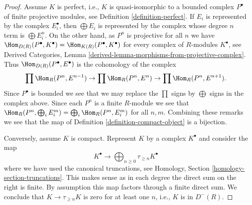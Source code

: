 \begin{proof}
Assume $K$ is perfect, i.e., $K$ is quasi-isomorphic to a bounded complex
$P^\bullet$ of finite projective modules, see
Definition \ref{definition-perfect}. If $E_i$ is represented by the complex
$E_i^\bullet$, then $\bigoplus E_i$ is represented by the complex
whose degree $n$ term is $\bigoplus E_i^n$. On the other hand,
as $P^n$ is projective for all $n$ we have
$\Hom_{D(R)}(P^\bullet, K^\bullet) = \Hom_{K(R)}(P^\bullet, K^\bullet)$
for every complex of $R$-modules $K^\bullet$, see
Derived Categories,
Lemma \ref{derived-lemma-morphisms-from-projective-complex}.
Thus $\Hom_{D(R)}(P^\bullet, E^\bullet)$ is the cohomology of the complex
$$
\prod \Hom_R(P^n, E^{n - 1}) \to
\prod \Hom_R(P^n, E^n) \to
\prod \Hom_R(P^n, E^{n + 1}).
$$
Since $P^\bullet$ is bounded we see that we may replace the $\prod$
signs by $\bigoplus$ signs in the complex above. Since each $P^n$ is a finite
$R$-module we see that
$\Hom_R(P^n, \bigoplus_i E_i^m) = \bigoplus_i \Hom_R(P^n, E_i^m)$
for all $n, m$.
Combining these remarks we see that the map of
Definition \ref{definition-compact-object}
is a bijection.

\medskip\noindent
Conversely, assume $K$ is compact.
Represent $K$ by a complex $K^\bullet$ and consider the map
$$
K^\bullet
\longrightarrow
\bigoplus\nolimits_{n \geq 0} \tau_{\geq n} K^\bullet
$$
where we have used the canonical truncations, see
Homology, Section \ref{homology-section-truncations}.
This makes sense as in each degree the direct sum on the right is finite.
By assumption this map factors through a finite direct sum.
We conclude that $K \to \tau_{\geq n} K$ is zero for at least one $n$,
i.e., $K$ is in $D^{-}(R)$.


\end{proof}

